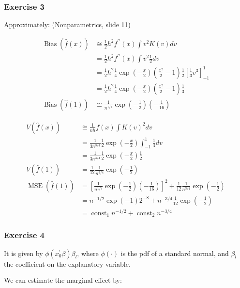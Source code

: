 {{\subsubsection*{Exercise 3}

Approximately: (Nonparametrics, slide 11)

$$
\begin{aligned}
\operatorname{Bias}(\hat{f}(x)) & \cong \frac{1}{2} h^{2} f^{\prime \prime}(x) \int v^{2} K(v) d v \\
& =\frac{1}{2} h^{2} f^{\prime \prime}(x) \int v^{2} \frac{1}{2} d v \\
& =\frac{1}{2} h^{2} \frac{1}{4} \exp \left(-\frac{x}{2}\right)\left(\frac{x^{2}}{2}-1\right) \frac{1}{2}\left[\frac{1}{3} v^{3}\right]_{-1}^{1} \\
& =\frac{1}{2} h^{2} \frac{1}{4} \exp \left(-\frac{x}{2}\right)\left(\frac{x^{2}}{2}-1\right) \frac{1}{3} \\
\operatorname{Bias}(\hat{f}(1)) & \cong \frac{1}{n^{1 / 4}} \exp \left(-\frac{1}{2}\right)\left(-\frac{1}{16}\right)
\end{aligned}
$$

$$
\begin{aligned}
V(\hat{f}(x)) & \cong \frac{1}{n h} f(x) \int K(v)^{2} d v \\
& =\frac{1}{3 n^{3 / 4}} \frac{1}{2} \exp \left(-\frac{x}{2}\right) \int_{-1}^{1} \frac{1}{4} d v \\
& =\frac{1}{3 n^{3 / 4}} \frac{1}{2} \exp \left(-\frac{x}{2}\right) \frac{1}{2} \\
V(\hat{f}(1)) & =\frac{1}{12} \frac{1}{n^{3 / 4}} \exp \left(-\frac{1}{2}\right) \\
\operatorname{MSE}(\hat{f}(1)) & =\left[\frac{1}{n^{1 / 4}} \exp \left(-\frac{1}{2}\right)\left(-\frac{1}{16}\right)\right]^{2}+\frac{1}{12} \frac{1}{n^{3 / 4}} \exp \left(-\frac{1}{2}\right) \\
& =n^{-1 / 2} \exp (-1) 2^{-8}+n^{-3 / 4} \frac{1}{12} \exp \left( -\frac{1}{2} \right) \\
& =\operatorname{const}_1 n^{-1 / 2}+\operatorname{const}_2 n^{-3 / 4}
\end{aligned}
$$
}
{
\subsubsection*{Exercise 4}

\begin{enumerate}[label=(\alph*)]
{\item 
It is given by $\phi\left(x_{0}^{\prime} \beta\right) \beta_{l}$, where $\phi(\cdot)$ is the pdf of a standard normal, and $\beta_{l}$ the coefficient on the explanatory variable.
}
{\item 
We can estimate the marginal effect by:

}
\end{enumerate}}}
